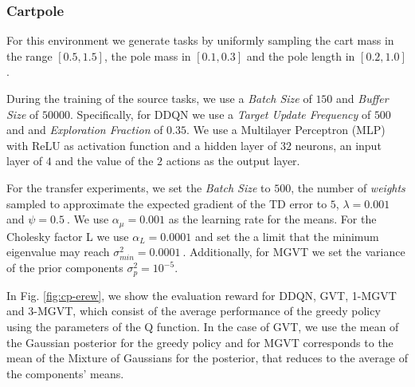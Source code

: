 \documentclass{article}
\begin{document}
\subsubsection{Cartpole}

For this environment we generate tasks by uniformly sampling the cart mass in the range $\left[0.5,1.5\right]$, the pole mass in $\left[0.1,0.3\right]$ and the pole length in $\left[0.2,1.0\right]$. 

During the training of the source tasks, we use a \textit{Batch Size} of $150$ and \textit{Buffer Size} of $50000$. Specifically, for DDQN we use a \textit{Target Update Frequency} of $500$ and and \textit{Exploration Fraction} of $0.35$. We use a Multilayer Perceptron (MLP) with ReLU as activation function and a hidden layer of $32$ neurons, an input layer of $4$ and the value of the $2$ actions as the output layer. 

For the transfer experiments, we set the \textit{Batch Size} to $500$, the number of \textit{weights} sampled to approximate the expected gradient of the TD error to $5$, $\lambda=0.001$ and $\psi=0.5\ $. We use $\alpha_{\mu}=0.001$ as the learning rate for the means. For the Cholesky factor L we use $\alpha_L=0.0001$ and set the a limit that the minimum eigenvalue may reach $\sigma_{min}^2=0.0001\ $. Additionally, for MGVT we set the variance of the prior components $\sigma_p^2=10^{-5}$.

In Fig. \ref{fig:cp-erew}, we show the evaluation reward for DDQN, GVT, 1-MGVT and 3-MGVT, which consist of the average performance of the greedy policy using the parameters of the Q function. In the case of GVT, we use the mean of the Gaussian posterior for the greedy policy and for MGVT corresponds to the mean of the Mixture of Gaussians for the posterior, that reduces to the average of the components' means. 
\end{document}

